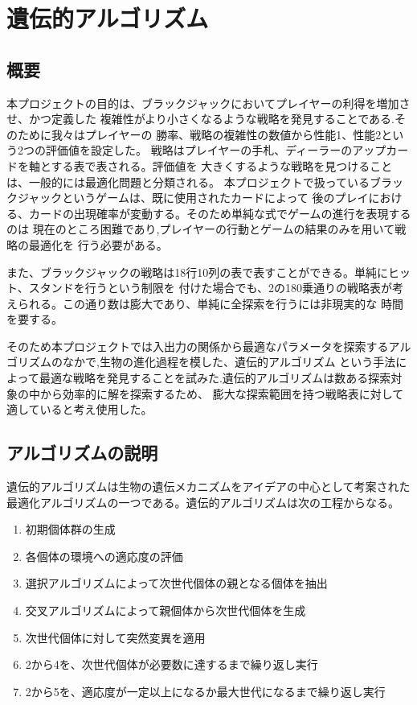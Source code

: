 \section{遺伝的アルゴリズム}
\subsection{概要}
本プロジェクトの目的は、ブラックジャックにおいてプレイヤーの利得を増加させ、かつ定義した
複雑性がより小さくなるような戦略を発見することである.そのために我々はプレイヤーの
勝率、戦略の複雑性の数値から性能1、性能2という2つの評価値を設定した。
戦略はプレイヤーの手札、ディーラーのアップカードを軸とする表で表される。評価値を
大きくするような戦略を見つけることは、一般的には最適化問題と分類される。
本プロジェクトで扱っているブラックジャックというゲームは、既に使用されたカードによって
後のプレイにおける、カードの出現確率が変動する。そのため単純な式でゲームの進行を表現するのは
現在のところ困難であり,プレイヤーの行動とゲームの結果のみを用いて戦略の最適化を
行う必要がある。

また、ブラックジャックの戦略は18行10列の表で表すことができる。単純にヒット、スタンドを行うという制限を
付けた場合でも、2の180乗通りの戦略表が考えられる。この通り数は膨大であり、単純に全探索を行うには非現実的な
時間を要する。

そのため本プロジェクトでは入出力の関係から最適なパラメータを探索するアルゴリズムのなかで,生物の進化過程を模した、遺伝的アルゴリズム
という手法によって最適な戦略を発見することを試みた.遺伝的アルゴリズムは数ある探索対象の中から効率的に解を探索するため、
膨大な探索範囲を持つ戦略表に対して適していると考え使用した。

\subsection{アルゴリズムの説明}
遺伝的アルゴリズムは生物の遺伝メカニズムをアイデアの中心として考案された最適化アルゴリズムの一つである。遺伝的アルゴリズムは次の工程からなる。
  \begin {enumerate}
    \item 初期個体群の生成
    \item 各個体の環境への適応度の評価
    \item 選択アルゴリズムによって次世代個体の親となる個体を抽出
    \item 交叉アルゴリズムによって親個体から次世代個体を生成
    \item 次世代個体に対して突然変異を適用
    \item 2から4を、次世代個体が必要数に達するまで繰り返し実行
    \item 2から5を、適応度が一定以上になるか最大世代になるまで繰り返し実行
  \end {enumerate}

